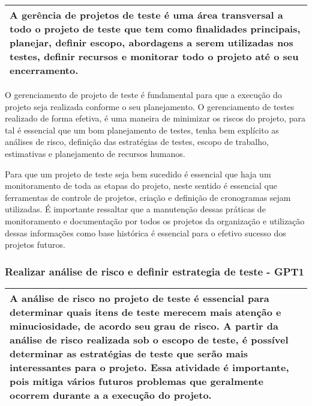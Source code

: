\begin{table}[!ht]
\centering
\begin{tabular}{|p{130mm}|}
\hline
A gerência de projetos de teste é uma área transversal a todo o projeto de teste que tem como finalidades principais, planejar, definir escopo, abordagens a serem utilizadas nos testes, definir recursos e monitorar todo o projeto até o seu encerramento.\\
\hline
\end{tabular}
\end{table}


O gerenciamento de projeto de teste é fundamental para que a execução do projeto seja realizada conforme o seu planejamento. O gerenciamento de testes realizado de forma efetiva, é uma maneira de minimizar os riscos do projeto, para tal é essencial que um bom planejamento de testes, tenha bem explícito as análises de risco, definição das estratégias de testes, escopo de trabalho, estimativas e planejamento de recursos humanos.

Para que um projeto de teste seja bem sucedido é essencial que haja um monitoramento de toda as etapas do projeto, neste sentido é essencial que ferramentas de controle de projetos, criação e definição de cronogramas sejam utilizadas. É importante ressaltar que a manutenção dessas práticas de monitoramento e documentação por todos os projetos da organização e utilização dessas informações como base histórica é essencial para o efetivo sucesso dos projetos futuros.

\subsubsection{Realizar análise de risco e definir estrategia de teste - GPT1}
\label{sec:gpt1}

\begin{table}[!ht]
\centering
\begin{tabular}{|p{130mm}|}
\hline
A análise de risco no projeto de teste é essencial para determinar quais itens de teste merecem mais atenção e minuciosidade, de acordo seu grau de risco. A partir da análise de risco realizada sob o escopo de teste, é possível determinar as estratégias de teste que serão mais interessantes para o projeto. Essa atividade é importante, pois mitiga vários futuros problemas que geralmente ocorrem durante a a execução do projeto. \\
\hline
\end{tabular}
\end{table}

